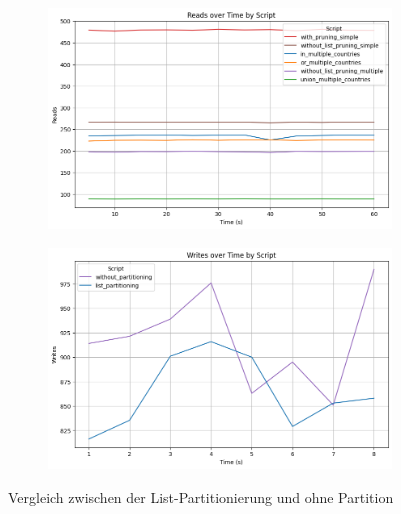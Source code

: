 \vspace{-7pt}
\begin{figure}[H]
	\centering
	\begin{subfigure}[t]{0.48\textwidth}
		\includegraphics[width=\textwidth]{PNGs/Script/Partition/list-partition/Reads}
	\end{subfigure}
	\hfill
	\begin{subfigure}[t]{0.48\textwidth}
		\includegraphics[width=\textwidth]{PNGs/Script/Partition/list-partition/Writes}
	\end{subfigure}
	\vspace{-9pt}
	\caption[List-Partitionierung: Unterschiedliche Abfragen mit und ohne Partition]{Vergleich zwischen der List-Partitionierung und ohne Partition}
	\label{fig:list-partition}
\end{figure}
\vspace{-19pt}

